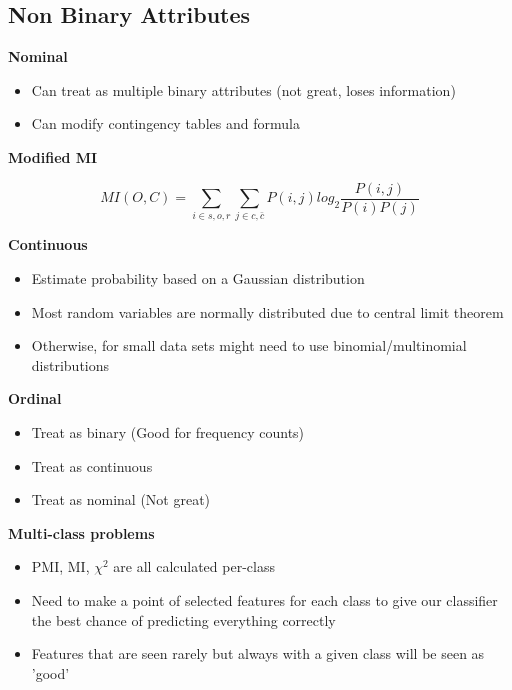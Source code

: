 \documentclass[a4paper,10pt]{article}
\begin{document}
\subsection*{Non Binary Attributes}
\textcolor{Periwinkle}{\textbf{Nominal}}
\begin{itemize}
	\item Can treat as multiple binary attributes (not great, loses information)
	\item Can modify contingency tables and formula
\end{itemize}
\newpage
\noindent \textcolor{Periwinkle}{\textbf{Modified MI}}
\begin{shaded}
	\begin{equation*}
		MI(O,C) = \sum_{i \in {s,o,r}} \sum_{j \in {c, \bar{c}}} P(i,j) log_{2} \frac{P(i,j)}{P(i)P(j)} 
	\end{equation*}
\end{shaded}
\noindent \textcolor{Periwinkle}{\textbf{Continuous}}
\begin{itemize}
	\item Estimate probability based on a Gaussian distribution 
	\item Most random variables are normally distributed due to central limit theorem 
	\item Otherwise, for small data sets might need to use binomial/multinomial distributions \\
\end{itemize}
\textcolor{Periwinkle}{\textbf{Ordinal}}
\begin{itemize}
	\item Treat as binary (Good for frequency counts)
	\item Treat as continuous
	\item Treat as nominal (Not great)
\end{itemize}
\textcolor{Periwinkle}{\textbf{Multi-class problems}}
\begin{itemize}
	\item PMI, MI, $\chi^{2}$ are all calculated per-class
	\item Need to make a point of selected features for each class to give our classifier the best chance of predicting everything correctly
	\item Features that are seen rarely but always with a given class will be seen as 'good'
\end{itemize}
\newpage
\end{document}
